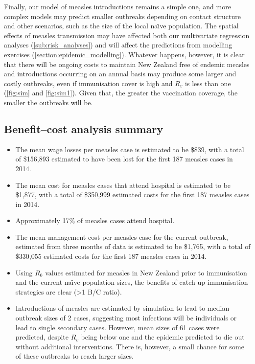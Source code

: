 \documentclass{article}
\begin{document}
Finally, our model of measles introductions remains a simple one, and more complex models may predict smaller outbreaks depending on contact structure and other scenarios, such as the size of the local na\"{\i}ve population. The spatial effects of measles transmission may have affected both our multivariate regression analyses (\autoref{sub:risk_analyses}) and will affect the predictions from modelling exercises (\autoref{section:epidemic_modelling}). Whatever happens, however, it is clear that there will be ongoing costs to maintain New Zealand free of endemic measles and introductions occurring on an annual basis may produce some larger and costly outbreaks, even if immunisation cover is high and $R_v$ is less than one (\autoref{fig:sim} and \autoref{fig:sim1}). Given that, the greater the vaccination coverage, the smaller the outbreaks will be.

\subsection{Benefit--cost analysis summary}
\begin{itemize}
\item The mean wage losses per measles case is estimated to be \$839, with a total of \$156,893 estimated to have been lost for the first 187 measles cases in 2014.
\item The mean cost for measles cases that attend hospital is estimated to be \$1,877, with a total of \$350,999 estimated costs for the first 187 measles cases in 2014.
\item Approximately 17\% of measles cases attend hospital.
\item The mean management cost per measles case for the current outbreak, estimated from three months of data is estimated to be \$1,765, with a total of \$330,055 estimated costs for the first 187 measles cases in 2014.
\item Using $R_0$ values estimated for measles in New Zealand prior to immunisation and the current na\"{\i}ve population sizes, the benefits of catch up immunisation strategies are clear (>1 B/C ratio).
\item Introductions of measles are estimated by simulation to lead to median outbreak sizes of 2 cases, suggesting most infections will be individuals or lead to single secondary cases. However, mean sizes of 61 cases were predicted, despite $R_v$ being below one and the epidemic predicted to die out without additional interventions. There is, however, a small chance for some of these outbreaks to reach larger sizes.
\end{itemize}
\end{document}
